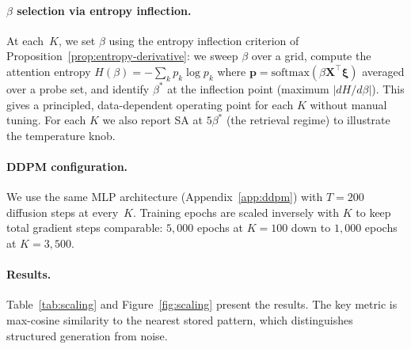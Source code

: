 \paragraph{$\beta$ selection via entropy inflection.}
At each~$K$, we set $\beta$ using the entropy inflection criterion of Proposition~\ref{prop:entropy-derivative}: we sweep $\beta$ over a grid, compute the attention entropy $H(\beta)=-\sum_k p_k\log p_k$ where $\mathbf{p}=\mathrm{softmax}(\beta\mathbf{X}^\top\boldsymbol{\xi})$ averaged over a probe set, and identify $\beta^*$ at the inflection point (maximum $|dH/d\beta|$). This gives a principled, data-dependent operating point for each $K$ without manual tuning. For each $K$ we also report SA at $5\beta^*$ (the retrieval regime) to illustrate the temperature knob.

\paragraph{DDPM configuration.}
We use the same MLP architecture (Appendix~\ref{app:ddpm}) with $T{=}200$ diffusion steps at every~$K$. Training epochs are scaled inversely with $K$ to keep total gradient steps comparable: $5{,}000$ epochs at $K{=}100$ down to $1{,}000$ epochs at $K{=}3{,}500$.

\paragraph{Results.}
Table~\ref{tab:scaling} and Figure~\ref{fig:scaling} present the results. The key metric is max-cosine similarity to the nearest stored pattern, which distinguishes structured generation from noise.

